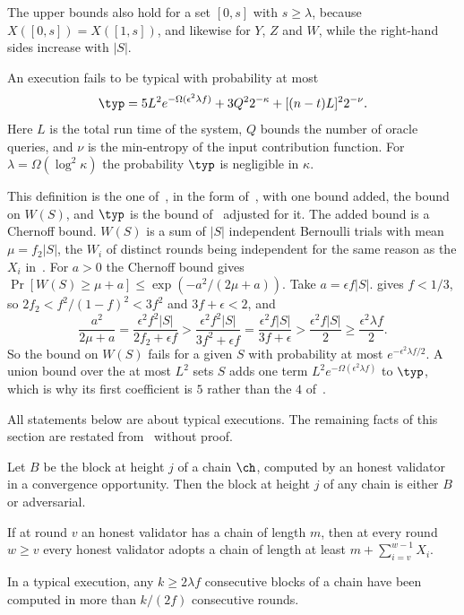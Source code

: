 The upper bounds also hold for a set $[0,s]$ with $s\ge\lambda$, because
$X([0,s])=X([1,s])$, and likewise for $Y$, $Z$ and $W$, while the right-hand
sides increase with $|S|$.

An execution fails to be typical with probability at most
\[
    \typ=5L^2e^{-\Omega(\epsilon^2\lambda f)}+3Q^22^{-\kappa}+[(n-t)L]^22^{-\nu}.
\]
Here $L$ is the total run time of the system, $Q$ bounds the number of oracle
queries, and $\nu$ is the min-entropy of the input contribution function. For
$\lambda=\Omega(\log^2\kappa)$ the probability $\typ$ is negligible in $\kappa$.

This definition is the one of~\cite[Definition 4.4]{gkl24}, in the form
of~\cite[Lemma 4.6]{gkl24}, with one bound added,
the bound on $W(S)$, and $\typ$ is the bound of~\cite[Theorem 4.5]{gkl24}
adjusted for it. The added bound is a Chernoff bound. $W(S)$ is a sum of $|S|$ independent
Bernoulli trials with mean $\mu=f_2|S|$, the $W_i$ of distinct rounds being
independent for the same reason as the $X_i$ in~\cite{gkl24}. For $a>0$ the Chernoff bound gives
$\Pr[W(S)\ge\mu+a]\le\exp(-a^2/(2\mu+a))$. Take $a=\epsilon f|S|$.  gives $f<1/3$, so
$2f_2<f^2/(1-f)^2<3f^2$ and $3f+\epsilon<2$, and
\[
    \frac{a^2}{2\mu+a} = \frac{\epsilon^2f^2|S|}{2f_2+\epsilon f}
    > \frac{\epsilon^2f^2|S|}{3f^2+\epsilon f} = \frac{\epsilon^2f|S|}{3f+\epsilon}
    > \frac{\epsilon^2f|S|}{2} \ge \frac{\epsilon^2\lambda f}{2} .
\]
So the bound on $W(S)$ fails for a given $S$ with probability at most
$e^{-\epsilon^2\lambda f/2}$. A union bound over the at most $L^2$ sets $S$ adds
one term $L^2e^{-\Omega(\epsilon^2\lambda f)}$ to $\typ$, which is why its first
coefficient is $5$ rather than the $4$ of~\cite{gkl24}.

All statements below are about typical executions. The remaining facts of this
section are restated from~\cite{gkl24} without proof.

\begin{lemma}\label{lem.unique}
    Let $B$ be the block at height $j$ of a chain $\ch$, computed by an honest
    validator in a convergence opportunity. Then the block at height $j$ of
    any chain is either $B$ or adversarial.
\end{lemma}

\begin{lemma}\label{lem.growth}
    If at round $v$ an honest validator has a chain of length $m$, then at every
    round $w\ge v$ every honest validator adopts a chain of length at least
    $m+\sum_{i=v}^{w-1}X_i$.
\end{lemma}

\begin{lemma}\label{lem.span}
    In a typical execution, any $k\ge2\lambda f$ consecutive blocks of a chain
    have been computed in more than $k/(2f)$ consecutive rounds.
\end{lemma}

